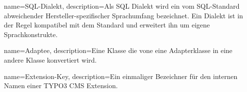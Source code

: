 {
	name={SQL-Dialekt},
	description={Als SQL Dialekt wird ein vom SQL-Standard abweichender Hersteller-spezifischer Sprachumfang bezeichnet. Ein Dialekt ist in der Regel kompatibel mit dem Standard und erweitert ihn um eigene Sprachkonstrukte.}
}

{
	name={Adaptee},
	description={Eine Klasse die vone eine Adapterklasse in eine andere Klasse konvertiert wird.}
}

{
	name={Extension-Key},
	description={Ein einmaliger Bezeichner für den internen Namen einer TYPO3 CMS Extension.}
}
